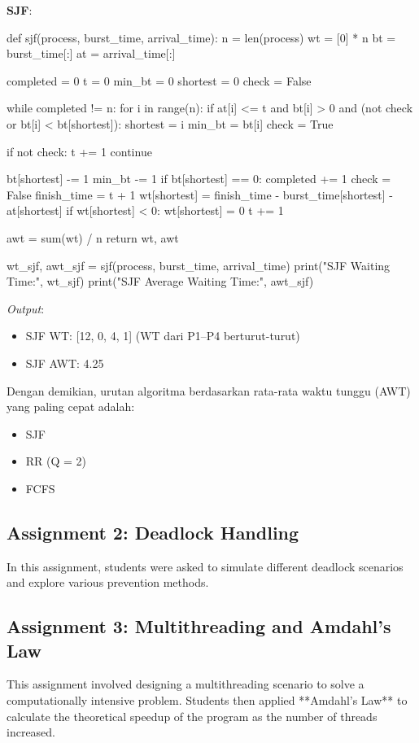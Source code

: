 \documentclass[12pt]{article}
\begin{document}
\textbf{SJF}:
\begin{python}
def sjf(process, burst_time, arrival_time):
    n = len(process)
    wt = [0] * n
    bt = burst_time[:]
    at = arrival_time[:]
    
    completed = 0
    t = 0
    min_bt = 0
    shortest = 0
    check = False
    
    while completed != n:
        for i in range(n):
            if at[i] <= t and bt[i] > 0 and (not check or bt[i] < bt[shortest]):
                shortest = i
                min_bt = bt[i]
                check = True
                
        if not check:
            t += 1
            continue
        
        bt[shortest] -= 1
        min_bt -= 1
        if bt[shortest] == 0:
            completed += 1
            check = False
            finish_time = t + 1
            wt[shortest] = finish_time - burst_time[shortest] - at[shortest]
            if wt[shortest] < 0:
                wt[shortest] = 0
        t += 1
    
    awt = sum(wt) / n
    return wt, awt

wt_sjf, awt_sjf = sjf(process, burst_time, arrival_time)
print("SJF Waiting Time:", wt_sjf)
print("SJF Average Waiting Time:", awt_sjf)
\end{python}
\textit{Output}:
\begin{itemize}
    \item SJF WT: [12, 0, 4, 1] (WT dari P1–P4 berturut-turut)
    \item SJF AWT: 4.25
\end{itemize}

Dengan demikian, urutan algoritma berdasarkan rata-rata waktu tunggu (AWT) yang paling cepat adalah:
\begin{itemize}
    \item SJF
    \item RR (Q = 2)
    \item FCFS
\end{itemize}

\subsection{Assignment 2: Deadlock Handling}
In this assignment, students were asked to simulate different deadlock scenarios and explore various prevention methods.

\subsection{Assignment 3: Multithreading and Amdahl's Law}
This assignment involved designing a multithreading scenario to solve a computationally intensive problem. Students then applied **Amdahl's Law** to calculate the theoretical speedup of the program as the number of threads increased.
\end{document}
